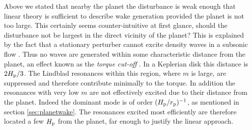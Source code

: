 Above we stated that nearby the planet the disturbance is weak enough that linear theory is sufficient to describe wake generation provided the planet is not too large.
This certainly seems counter-intuitive at first glance, should the disturbance not be largest in the direct vicinity of the planet?
This is explained by the fact that a stationary perturber cannot excite density waves in a subsonic flow \citep{landau1959}.
Thus no waves are generated within some characteristic distance from the planet, an effect known as the \textit{torque cut-off} \citep{goldreich1980}.
In a Keplerian disk this distance is $2H_{\rm p}/3$.
The Lindblad resonances within this region, where $m$ is large, are suppressed and therefore contribute minimally to the torque.
In addition the resonances with very low $m$ are not effectively excited due to their distance from the planet.
Indeed the dominant mode is of order $(H_{\rm p} / r_{\rm p})^{-1}$, as mentioned in section \ref{sec:planetwake}.
The resonances excited most efficiently are therefore located a few $H_{\rm p}$ from the planet, far enough to justify the linear approach.


